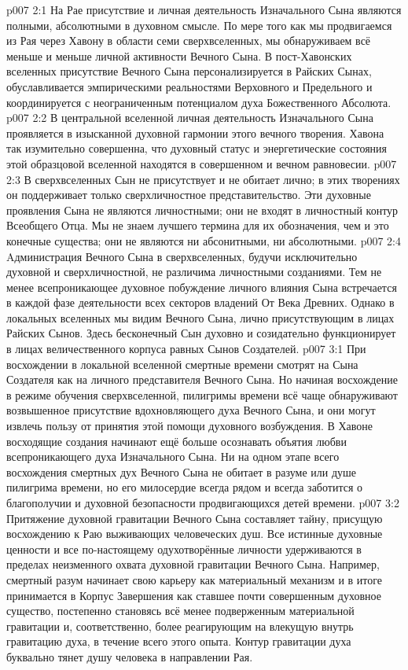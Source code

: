 \vs p007 2:1 На Рае присутствие и личная деятельность Изначального Сына являются полными, абсолютными в духовном смысле. По мере того как мы продвигаемся из Рая через Хавону в области семи сверхвселенных, мы обнаруживаем всё меньше и меньше личной активности Вечного Сына. В пост\hyp{}Хавонских вселенных присутствие Вечного Сына персонализируется в Райских Сынах, обуславливается эмпирическими реальностями Верховного и Предельного и координируется с неограниченным потенциалом духа Божественного Абсолюта.
\vs p007 2:2 В центральной вселенной личная деятельность Изначального Сына проявляется в изысканной духовной гармонии этого вечного творения. Хавона так изумительно совершенна, что духовный статус и энергетические состояния этой образцовой вселенной находятся в совершенном и вечном равновесии.
\vs p007 2:3 В сверхвселенных Сын не присутствует и не обитает лично; в этих творениях он поддерживает только сверхличностное представительство. Эти духовные проявления Сына не являются личностными; они не входят в личностный контур Всеобщего Отца. Мы не знаем лучшего термина для их обозначения, чем  и это конечные существа; они не являются ни абсонитными, ни абсолютными.
\vs p007 2:4 Aдминистрация Вечного Сына в сверхвселенных, будучи исключительно духовной и сверхличностной, не различима личностными созданиями. Тем не менее всепроникающее духовное побуждение личного влияния Сына встречается в каждой фазе деятельности всех секторов владений От Века Древних. Однако в локальных вселенных мы видим Вечного Сына, лично присутствующим в лицах Райских Сынов. Здесь бесконечный Сын духовно и созидательно функционирует в лицах величественного корпуса равных Сынов Создателей.
\vs p007 3:1 При восхождении в локальной вселенной смертные времени смотрят на Сына Создателя как на личного представителя Вечного Сына. Но начиная восхождение в режиме обучения сверхвселенной, пилигримы времени всё чаще обнаруживают возвышенное присутствие вдохновляющего духа Вечного Сына, и они могут извлечь пользу от принятия этой помощи духовного возбуждения. В Хавоне восходящие создания начинают ещё больше осознавать объятия любви всепроникающего духа Изначального Сына. Ни на одном этапе всего восхождения смертных дух Вечного Сына не обитает в разуме или душе пилигрима времени, но его милосердие всегда рядом и всегда заботится о благополучии и духовной безопасности продвигающихся детей времени.
\vs p007 3:2 Притяжение духовной гравитации Вечного Сына составляет тайну, присущую восхождению к Раю выживающих человеческих душ. Все истинные духовные ценности и все по\hyp{}настоящему одухотворённые личности удерживаются в пределах неизменного охвата духовной гравитации Вечного Сына. Например, смертный разум начинает свою карьеру как материальный механизм и в итоге принимается в Корпус Завершения как ставшее почти совершенным духовное существо, постепенно становясь всё менее подверженным материальной гравитации и, соответственно, более реагирующим на влекущую внутрь гравитацию духа, в течение всего этого опыта. Контур гравитации духа буквально тянет душу человека в направлении Рая.
